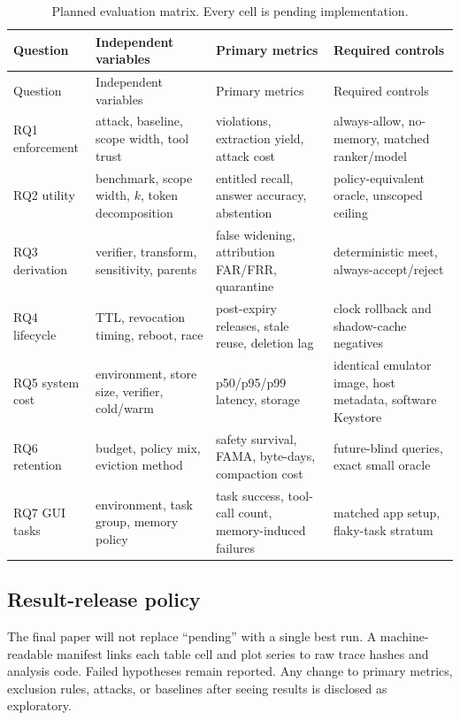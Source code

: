 \begin{longtable}{p{}p{}p{}p{}}
\caption{Planned evaluation matrix. Every cell is pending implementation.}\label{tab:experiment-matrix}\\
\toprule
Question & Independent variables & Primary metrics & Required controls \\
\midrule
\endfirsthead
\toprule
Question & Independent variables & Primary metrics & Required controls \\
\midrule
\endhead
RQ1 enforcement & attack, baseline, scope width, tool trust & violations, extraction yield, attack cost & always-allow, no-memory, matched ranker/model \\
RQ2 utility & benchmark, scope width, $k$, token decomposition & entitled recall, answer accuracy, abstention & policy-equivalent oracle, unscoped ceiling \\
RQ3 derivation & verifier, transform, sensitivity, parents & false widening, attribution FAR/FRR, quarantine & deterministic meet, always-accept/reject \\
RQ4 lifecycle & TTL, revocation timing, reboot, race & post-expiry releases, stale reuse, deletion lag & clock rollback and shadow-cache negatives \\
RQ5 system cost & environment, store size, verifier, cold/warm & p50/p95/p99 latency, storage & identical emulator image, host metadata, software Keystore \\
RQ6 retention & budget, policy mix, eviction method & safety survival, FAMA, byte-days, compaction cost & future-blind queries, exact small oracle \\
RQ7 GUI tasks & environment, task group, memory policy & task success, tool-call count, memory-induced failures & matched app setup, flaky-task stratum \\
\bottomrule
\end{longtable}

\subsection{Result-release policy}

The final paper will not replace ``pending'' with a single best run. A machine-readable manifest links each table cell and plot series to raw trace hashes and analysis code. Failed hypotheses remain reported. Any change to primary metrics, exclusion rules, attacks, or baselines after seeing results is disclosed as exploratory.
